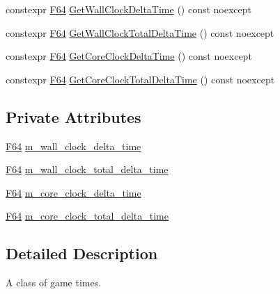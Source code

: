 \begin{DoxyCompactItemize}
\item 
constexpr \mbox{\hyperlink{namespacemage_ad26233bbec640deda836e572c1a23708}{F64}} \mbox{\hyperlink{classmage_1_1_game_time_a2ff13142221349d3368645bcbe0cfb8d}{Get\+Wall\+Clock\+Delta\+Time}} () const noexcept
\item 
constexpr \mbox{\hyperlink{namespacemage_ad26233bbec640deda836e572c1a23708}{F64}} \mbox{\hyperlink{classmage_1_1_game_time_a75c3675ead79cd32c9d77c70f3bd67ba}{Get\+Wall\+Clock\+Total\+Delta\+Time}} () const noexcept
\item 
constexpr \mbox{\hyperlink{namespacemage_ad26233bbec640deda836e572c1a23708}{F64}} \mbox{\hyperlink{classmage_1_1_game_time_a19333f5e42d9b968e0a172592f7d0bb8}{Get\+Core\+Clock\+Delta\+Time}} () const noexcept
\item 
constexpr \mbox{\hyperlink{namespacemage_ad26233bbec640deda836e572c1a23708}{F64}} \mbox{\hyperlink{classmage_1_1_game_time_a3331e36e04befebb4cebac79d12deb16}{Get\+Core\+Clock\+Total\+Delta\+Time}} () const noexcept
\end{DoxyCompactItemize}
\subsection*{Private Attributes}
\begin{DoxyCompactItemize}
\item 
\mbox{\hyperlink{namespacemage_ad26233bbec640deda836e572c1a23708}{F64}} \mbox{\hyperlink{classmage_1_1_game_time_afd4f74b4c930532dbb3b3259cbc068de}{m\+\_\+wall\+\_\+clock\+\_\+delta\+\_\+time}}
\item 
\mbox{\hyperlink{namespacemage_ad26233bbec640deda836e572c1a23708}{F64}} \mbox{\hyperlink{classmage_1_1_game_time_a5c2527df90b45a7b4e914c8811fcf52d}{m\+\_\+wall\+\_\+clock\+\_\+total\+\_\+delta\+\_\+time}}
\item 
\mbox{\hyperlink{namespacemage_ad26233bbec640deda836e572c1a23708}{F64}} \mbox{\hyperlink{classmage_1_1_game_time_abe875fff075fa87e4d029221f84b9f35}{m\+\_\+core\+\_\+clock\+\_\+delta\+\_\+time}}
\item 
\mbox{\hyperlink{namespacemage_ad26233bbec640deda836e572c1a23708}{F64}} \mbox{\hyperlink{classmage_1_1_game_time_ad030e0d01cfdfb3080caa74142cd6775}{m\+\_\+core\+\_\+clock\+\_\+total\+\_\+delta\+\_\+time}}
\end{DoxyCompactItemize}


\subsection{Detailed Description}
A class of game times. 

